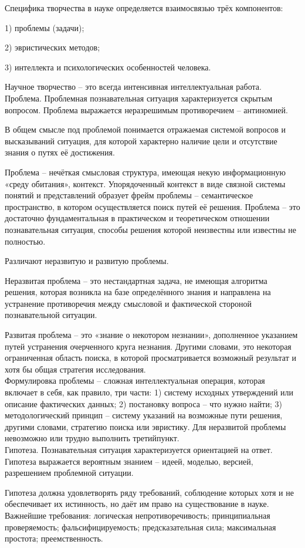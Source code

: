 \documentclass[exam_answers.tex]{subfiles}
\begin{document}
\renewcommand{\baselinestretch}{\blch}

Специфика творчества в науке определяется взаимосвязью трёх компонентов:

1) проблемы (задачи);

2) эвристических методов;

3) интеллекта и психологических особенностей человека.

Научное творчество – это всегда интенсивная интеллектуальная работа.
\\

Проблема. Проблемная познавательная ситуация характеризуется скрытым вопросом. Проблема выражается неразрешимым противоречием – антиномией.

В общем смысле под проблемой понимается отражаемая системой вопросов и высказываний ситуация, для которой характерно наличие цели и отсутствие знания о путях её достижения.

Проблема – нечёткая смысловая структура, имеющая некую информационную «среду обитания», контекст.
Упорядоченный контекст в виде связной системы понятий и представлений образует фрейм проблемы – семантическое пространство, в котором осуществляется поиск путей её решения.
Проблема – это достаточно фундаментальная в практическом и теоретическом отношении познавательная ситуация, способы решения которой неизвестны или известны не полностью.

Различают неразвитую и развитую проблемы.

Неразвитая проблема – это нестандартная задача, не имеющая алгоритма решения, которая возникла на базе определённого знания и направлена на устранение противоречия между смысловой и фактической стороной познавательной ситуации.

Развитая проблема – это «знание о некотором незнании», дополненное указанием путей устранения очерченного круга незнания.
Другими словами, это некоторая ограниченная область поиска, в которой просматривается возможный результат и хотя бы общая стратегия исследования.
\\

Формулировка проблемы – сложная интеллектуальная операция, которая включает в себя, как правило, три части:
1) систему исходных утверждений или описание фактических данных;
2) постановку вопроса – что нужно найти;
3) методологический принцип – систему указаний на возможные пути решения, другими словами, стратегию поиска или эвристику. Для неразвитой проблемы невозможно или трудно выполнить третийпункт.
\\

Гипотеза.
Познавательная ситуация характеризуется ориентацией на ответ.
Гипотеза выражается вероятным знанием – идеей, моделью, версией, разрешением проблемной ситуации.

Гипотеза должна удовлетворять ряду требований, соблюдение которых хотя и не обеспечивает их истинность, но даёт им право на существование в науке.
Важнейшие требования: логическая непротиворечивость; принципиальная проверяемость; фальсифицируемость; предсказательная сила; максимальная простота; преемственность.
\end{document}
